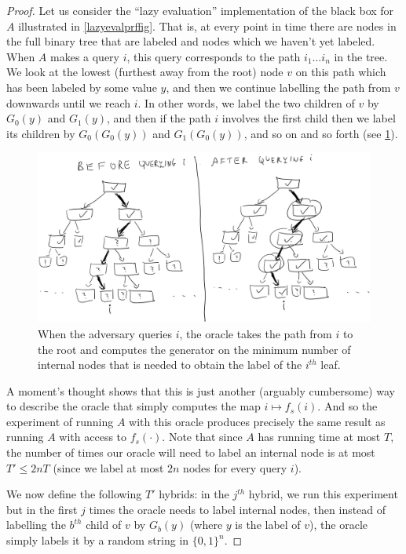 \begin{proof}
Let us consider the ``lazy evaluation'' implementation of the black box
for \(A\) illustrated in \cref{lazyevalprffig}. That is, at every point
in time there are nodes in the full binary tree that are labeled and
nodes which we haven't yet labeled. When \(A\) makes a query \(i\), this
query corresponds to the path \(i_1\ldots i_n\) in the tree. We look at
the lowest (furthest away from the root) node \(v\) on this path which
has been labeled by some value \(y\), and then we continue labelling the
path from \(v\) downwards until we reach \(i\). In other words, we label
the two children of \(v\) by \(G_0(y)\) and \(G_1(y)\), and then if the
path \(i\) involves the first child then we label its children by
\(G_0(G_0(y))\) and \(G_1(G_0(y))\), and so on and so forth (see
\cref{oracleevaltreefig}).


\begin{figure}
\centering
\includegraphics[width=\textwidth, height=0.25\paperheight, keepaspectratio]{../figure/prf-oracle-step.jpg}
\caption{When the adversary queries \(i\), the oracle takes the path
from \(i\) to the root and computes the generator on the minimum number
of internal nodes that is needed to obtain the label of the \(i^{th}\)
leaf.}
\label{oracleevaltreefig}
\end{figure}

A moment's thought shows that this is just another (arguably cumbersome)
way to describe the oracle that simply computes the map
\(i\mapsto f_s(i)\). And so the experiment of running \(A\) with this
oracle produces precisely the same result as running \(A\) with access
to \(f_s(\cdot)\). Note that since \(A\) has running time at most \(T\),
the number of times our oracle will need to label an internal node is at
most \(T' \leq 2nT\) (since we label at most \(2n\) nodes for every
query \(i\)).

We now define the following \(T'\) hybrids: in the \(j^{th}\) hybrid, we
run this experiment but in the first \(j\) times the oracle needs to
label internal nodes, then instead of labelling the \(b^{th}\) child of
\(v\) by \(G_b(y)\) (where \(y\) is the label of \(v\)), the oracle
simply labels it by a random string in \(\{0,1\}^n\).


\end{proof}
